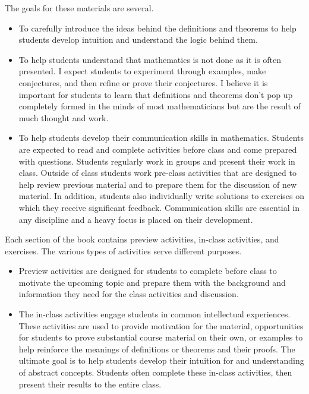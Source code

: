 The goals for these materials are several.
\begin{itemize}
\item To carefully introduce the ideas behind the definitions and theorems to help students develop intuition and understand the logic behind them.
\item To help students understand that mathematics is not done as it is often presented. I expect students to experiment through examples, make conjectures, and then refine or prove their conjectures. I believe it is important for students to learn that definitions and theorems don't pop up completely formed in the minds of most mathematicians but are the result of much thought and work.
\item To help students develop their communication skills in mathematics. Students are expected to read and complete activities before class and come prepared with questions. Students regularly work in groups and present their work in class. Outside of class students work pre-class activities that are designed to help review previous material and to prepare them for the discussion of new material. In addition, students also individually write solutions to exercises on which they receive significant feedback. Communication skills are essential in any discipline and a heavy focus is placed on their development.
\end{itemize}



Each section of the book contains preview activities, in-class activities, and exercises. The various types of activities serve different purposes.

\begin{itemize}
\item Preview activities are designed for students to complete before class to motivate the upcoming topic and prepare them with the background and information they need for the class activities and discussion.
\item The in-class activities engage students in common intellectual experiences. These activities are used to provide motivation for the material, opportunities for students to prove substantial course material on their own, or examples to help reinforce the meanings of definitions or theorems and their proofs. The ultimate goal is to help students develop their intuition for and understanding of abstract concepts. Students often complete these in-class activities, then present their results to the entire class.
\end{itemize}

